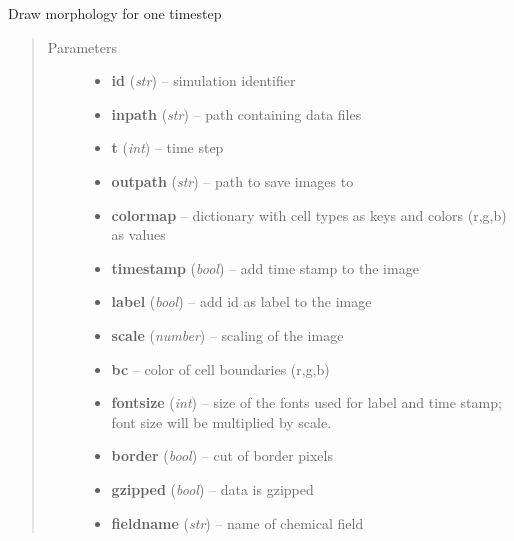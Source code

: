 \documentclass[letterpaper,10pt,english]{sphinxmanual}
\begin{document}
\begin{fulllineitems}
\label{ImageUtils:ImageUtils.makeImage}
Draw morphology for one timestep
\begin{quote}\begin{description}
\item[{Parameters}] \leavevmode\begin{itemize}
\item {} 
\textbf{id} (\emph{str}) -- simulation identifier

\item {} 
\textbf{inpath} (\emph{str}) -- path containing data files

\item {} 
\textbf{t} (\emph{int}) -- time step

\item {} 
\textbf{outpath} (\emph{str}) -- path to save images to

\item {} 
\textbf{colormap} -- dictionary with cell types as keys and colors (r,g,b) as values

\item {} 
\textbf{timestamp} (\emph{bool}) -- add time stamp to the image

\item {} 
\textbf{label} (\emph{bool}) -- add id as label to the image

\item {} 
\textbf{scale} (\emph{number}) -- scaling of the image

\item {} 
\textbf{bc} -- color of cell boundaries (r,g,b)

\item {} 
\textbf{fontsize} (\emph{int}) -- size of the fonts used for label and time stamp; font size will be multiplied by scale.

\item {} 
\textbf{border} (\emph{bool}) -- cut of border pixels

\item {} 
\textbf{gzipped} (\emph{bool}) -- data is gzipped

\item {} 
\textbf{fieldname} (\emph{str}) -- name of chemical field


\end{itemize}
\end{description}
\end{quote}
\end{fulllineitems}
\end{document}
